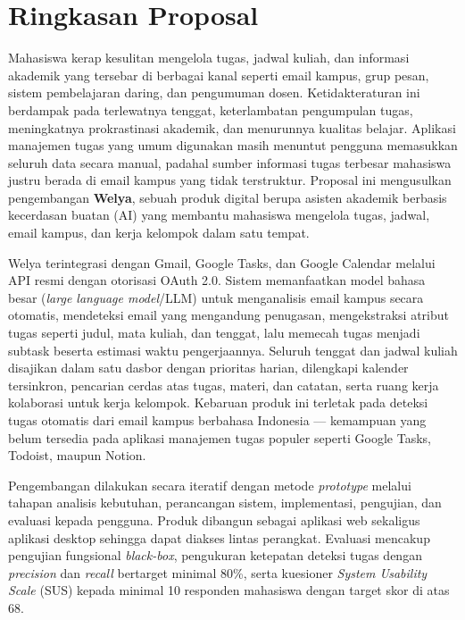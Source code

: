 \chapter*{Ringkasan Proposal}

\begin{singlespace}
  Mahasiswa kerap kesulitan mengelola tugas, jadwal kuliah, dan informasi
  akademik yang tersebar di berbagai kanal seperti email kampus, grup pesan,
  sistem pembelajaran daring, dan pengumuman dosen. Ketidakteraturan ini
  berdampak pada terlewatnya tenggat, keterlambatan pengumpulan tugas,
  meningkatnya prokrastinasi akademik, dan menurunnya kualitas belajar.
  Aplikasi manajemen tugas yang umum digunakan masih menuntut pengguna
  memasukkan seluruh data secara manual, padahal sumber informasi tugas
  terbesar mahasiswa justru berada di email kampus yang tidak terstruktur.
  Proposal ini mengusulkan pengembangan \textbf{Welya}, sebuah produk
  digital berupa asisten akademik berbasis kecerdasan buatan (AI) yang
  membantu mahasiswa mengelola tugas, jadwal, email kampus, dan kerja
  kelompok dalam satu tempat.

  Welya terintegrasi dengan Gmail, Google Tasks, dan Google Calendar melalui
  API resmi dengan otorisasi OAuth 2.0. Sistem memanfaatkan model bahasa
  besar (\emph{large language model}/LLM) untuk menganalisis email kampus
  secara otomatis, mendeteksi email yang mengandung penugasan, mengekstraksi
  atribut tugas seperti judul, mata kuliah, dan tenggat, lalu memecah tugas
  menjadi subtask beserta estimasi waktu pengerjaannya. Seluruh tenggat dan
  jadwal kuliah disajikan dalam satu dasbor dengan prioritas harian,
  dilengkapi kalender tersinkron, pencarian cerdas atas tugas, materi, dan
  catatan, serta ruang kerja kolaborasi untuk kerja kelompok. Kebaruan
  produk ini terletak pada deteksi tugas otomatis dari email kampus
  berbahasa Indonesia --- kemampuan yang belum tersedia pada aplikasi
  manajemen tugas populer seperti Google Tasks, Todoist, maupun Notion.

  Pengembangan dilakukan secara iteratif dengan metode \emph{prototype}
  melalui tahapan analisis kebutuhan, perancangan sistem, implementasi,
  pengujian, dan evaluasi kepada pengguna. Produk dibangun sebagai aplikasi
  web sekaligus aplikasi desktop sehingga dapat diakses lintas perangkat.
  Evaluasi mencakup pengujian fungsional \emph{black-box}, pengukuran
  ketepatan deteksi tugas dengan \emph{precision} dan \emph{recall}
  bertarget minimal 80\%, serta kuesioner \emph{System Usability Scale}
  (SUS) kepada minimal 10 responden mahasiswa dengan target skor di atas 68.


\end{singlespace}

